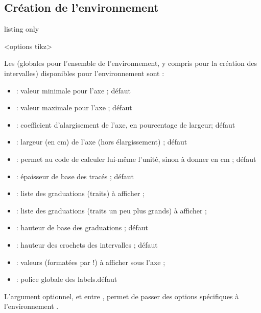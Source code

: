 \begin{PresCodePL}{}
\begin{RepIntervalles}
\end{RepIntervalles}
\end{PresCodePL}

\subsection{Création de l'environnement}

\begin{PresCodeTexPL}{listing only}
\begin{RepIntervalles}[clés]<options tikz>
\end{RepIntervalles}
\end{PresCodeTexPL}

\begin{cautionblock}
Les  (globales pour l'ensemble de l'environnement, y compris pour la création des intervalles) disponibles pour l'environnement  sont :

\begin{itemize}
	\item {} : valeur minimale pour l'axe ; \hfill{}défaut 
	\item {} : valeur maximale pour l'axe ; \hfill{}défaut 
	\item {} : coefficient d'alargisement de l'axe, en pourcentage de largeur; \hfill{}défaut 
	\item {} : largeur (en cm) de l'axe (hors élargissement) ; \hfill{}défaut 
	\item {} : permet au code de calculer lui-même l'unité, sinon à donner en cm ; \hfill{}défaut 
	\item {} : épaisseur de base des tracés ; \hfill{}défaut \Cle{0.8pt}
	\item {} : liste des graduations (traits) à afficher ;
	\item {} : liste des graduations (traits un peu plus grands) à afficher ;
	\item {} : hauteur de base des graduations ; \hfill{}défaut \Cle{7pt}
	\item {} : hauteur des crochets des intervalles ; \hfill{}défaut \Cle{16pt}
	\item {} : valeurs (formatées par  !) à afficher sous l'axe ;
	\item {} : police globale des labels.\hfill{}défaut 
\end{itemize}

L'argument optionnel, et entre , permet de passer des options spécifiques à l'environnement \TikZ.
\end{cautionblock}

